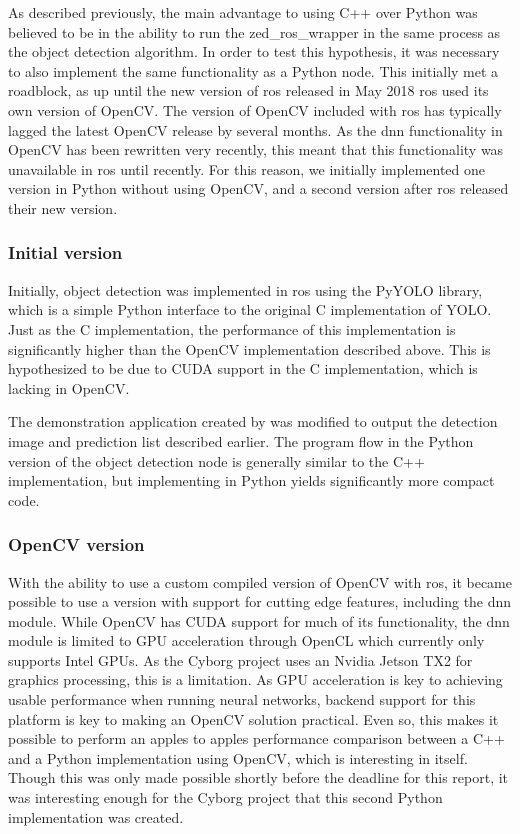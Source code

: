 \documentclass[\rootfolder/main.tex]{subfiles}
\begin{document}
As described previously, the main advantage to using C++ over Python was believed to be in the ability to run the zed\_ros\_wrapper in the same process as the object detection algorithm.
In order to test this hypothesis, it was necessary to also implement the same functionality as a Python node.
This initially met a roadblock, as up until the new version of \acrshort{ros} released in May 2018 \acrshort{ros} used its own version of OpenCV.
The version of OpenCV included with \acrshort{ros} has typically lagged the latest OpenCV release by several months.
As the \acrshort{dnn} functionality in OpenCV has been rewritten very recently, this meant that this functionality was unavailable in \acrshort{ros} until recently.
For this reason, we initially implemented one version in Python without using OpenCV, and a second version after \acrshort{ros} released their new version.

\subsubsection{Initial version}

Initially, object detection was implemented in \acrshort{ros} using the PyYOLO library, which is a simple Python interface to the original C implementation of YOLO.
Just as the C implementation, the performance of this implementation is significantly higher than the OpenCV implementation described above.
This is hypothesized to be due to CUDA support in the C implementation, which is lacking in OpenCV.

The demonstration application created by \cite{Opheim2018} was modified to output the detection image and prediction list described earlier.
The program flow in the Python version of the object detection node is generally similar to the C++ implementation, but implementing in Python yields significantly more compact code.

\subsubsection{OpenCV version}

With the ability to use a custom compiled version of OpenCV with \acrshort{ros}, it became possible to use a version with support for cutting edge features, including the \acrfull{dnn} module.
While OpenCV has CUDA support for much of its functionality, the \acrshort{dnn} module is limited to GPU acceleration through OpenCL which currently only supports Intel GPUs.
As the Cyborg project uses an Nvidia Jetson TX2 for graphics processing, this is a limitation.
As GPU acceleration is key to achieving usable performance when running neural networks, backend support for this platform is key to making an OpenCV solution practical.
Even so, this makes it possible to perform an apples to apples performance comparison between a C++ and a Python implementation using OpenCV, which is interesting in itself.
Though this was only made possible shortly before the deadline for this report, it was interesting enough for the Cyborg project that this second Python implementation was created.
\end{document}
